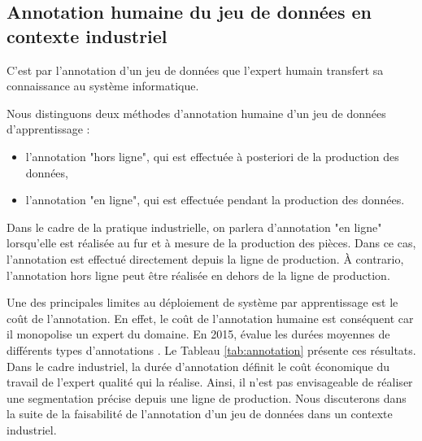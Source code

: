 
\subsection{Annotation humaine du jeu de données en contexte industriel}
C'est par l'annotation d'un jeu de données que l'expert humain transfert sa connaissance au système informatique.

Nous distinguons deux méthodes d'annotation humaine d'un jeu de données d'apprentissage :
\begin{itemize}
	\item l'annotation "hors ligne", qui est effectuée à posteriori de la production des données,
	\item l'annotation "en ligne", qui est effectuée pendant la production des données.
\end{itemize}
Dans le cadre de la pratique industrielle, on parlera d'annotation "en ligne" lorsqu'elle est réalisée au fur et à mesure de la production des pièces.
Dans ce cas, l'annotation est effectué directement depuis la ligne de production.
À contrario, l'annotation hors ligne peut être réalisée en dehors de la ligne de production.

Une des principales limites au déploiement de système par apprentissage est le coût de l'annotation.
En effet, le coût de l'annotation humaine est conséquent car il monopolise un expert du domaine.
En 2015, \citeauthor{bearman_what_2015} évalue les durées moyennes de différents types d'annotations \cite{bearman_what_2015}.
Le Tableau \ref{tab:annotation} présente ces résultats.
Dans le cadre industriel, la durée d'annotation définit le coût économique du travail de l'expert qualité qui la réalise.
Ainsi, il n'est pas envisageable de réaliser une segmentation précise depuis une ligne de production.
Nous discuterons dans la suite de la faisabilité de l'annotation d'un jeu de données dans un contexte industriel.


